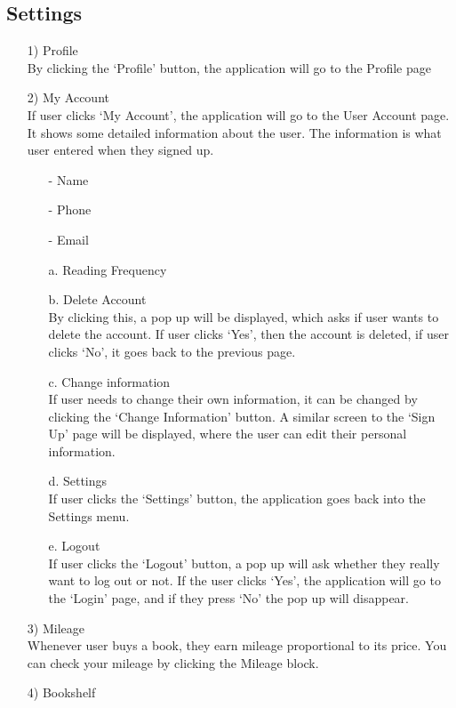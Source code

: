 \documentclass[conference]{IEEEtran}
\begin{document}
\subsection{Settings}
\begin{itemize} 
    \item[1)] Profile \\
    By clicking the ‘Profile’ button, the application will go to the Profile page
    \item[2)] My Account \\
    If user clicks ‘My Account’,  the application will go to the User Account page. It shows some detailed information about the user. The information is what user entered when they signed up.
    \begin{itemize}
        \item[-] Name
        \item[-] Phone
        \item[-] Email
        \item[a.] Reading Frequency
        \item[b.] Delete Account \\
        By clicking this, a pop up will be displayed, which asks if user wants to delete the account. If user clicks ‘Yes’, then the account is deleted, if user clicks ‘No’, it goes back to the previous page.
        \item[c.] Change information \\
        If user needs to change their own information, it can be changed by clicking the ‘Change Information’ button. A similar screen to the ‘Sign Up’ page will be displayed, where the user can edit their personal information.
        \item[d.] Settings \\
        If user clicks the ‘Settings’ button, the application goes back into the Settings menu.
        \item[e.] Logout \\
        If user clicks the ‘Logout’ button, a pop up will ask whether they really want to log out or not. If the user clicks ‘Yes’,  the application will go to the ‘Login’ page, and if they press ‘No’  the pop up will disappear. 
    \end{itemize}
    \item[3)] Mileage \\
    Whenever user buys a book, they earn mileage proportional to its price. You can check your mileage by clicking the Mileage block.
    \item[4)] Bookshelf \\

\end{itemize}
\end{document}
